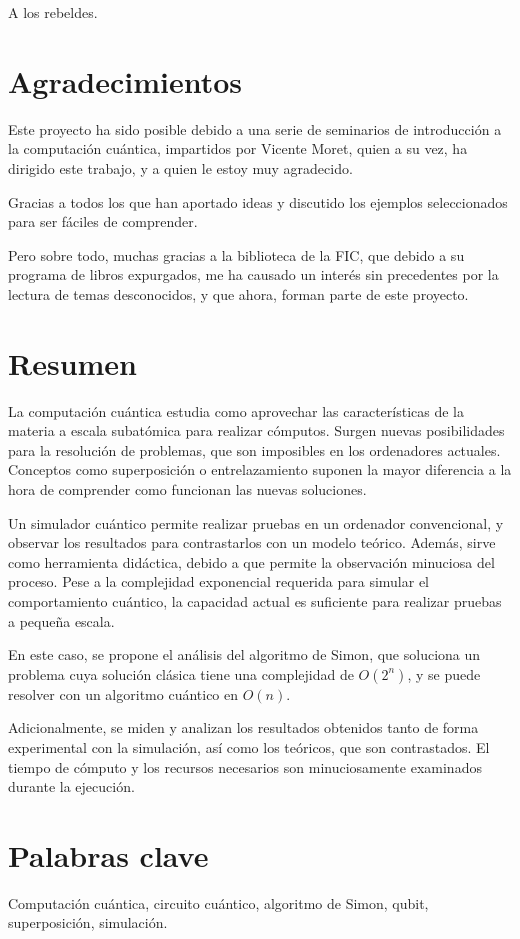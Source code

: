 \begin{dedication}
A los rebeldes.
\end{dedication}

\thispagestyle{empty}
\cleardoublepage
\chapter*{Agradecimientos}

Este proyecto ha sido posible debido a una serie de seminarios de introducción a 
la computación cuántica, impartidos por Vicente Moret, quien a su vez, ha 
dirigido este trabajo, y a quien le estoy muy agradecido.

Gracias a todos los que han aportado ideas y discutido los ejemplos 
seleccionados para ser fáciles de comprender.

Pero sobre todo, muchas gracias a la biblioteca de la FIC, que debido a su 
programa de libros expurgados, me ha causado un interés sin precedentes por la 
lectura de temas desconocidos, y que ahora, forman parte de este proyecto.

\clearpage
\thispagestyle{empty}
\cleardoublepage

\chapter*{Resumen}
\noindent
La computación cuántica estudia como aprovechar las características de la 
materia a escala subatómica para realizar cómputos. Surgen nuevas posibilidades 
para la resolución de problemas, que son imposibles en los ordenadores actuales.  
Conceptos como superposición o entrelazamiento suponen la mayor diferencia a la 
hora de comprender como funcionan las nuevas soluciones.

Un simulador cuántico permite realizar pruebas en un ordenador convencional, y 
observar los resultados para contrastarlos con un modelo teórico. Además, sirve 
como herramienta didáctica, debido a que permite la observación minuciosa del 
proceso. Pese a la complejidad exponencial requerida para simular el 
comportamiento cuántico, la capacidad actual es suficiente para realizar pruebas 
a pequeña escala.

En este caso, se propone el análisis del algoritmo de Simon, que soluciona un 
problema cuya solución clásica tiene una complejidad de $O(2^n)$, y se puede 
resolver con un algoritmo cuántico en $O(n)$.

Adicionalmente, se miden y analizan los resultados obtenidos tanto de forma 
experimental con la simulación, así como los teóricos, que son contrastados. El 
tiempo de cómputo y los recursos necesarios son minuciosamente examinados 
durante la ejecución.

\clearpage
\thispagestyle{empty}
\cleardoublepage

\chapter*{Palabras clave}
\noindent
Computación cuántica, circuito cuántico, algoritmo de Simon, qubit,
superposición, simulación.
